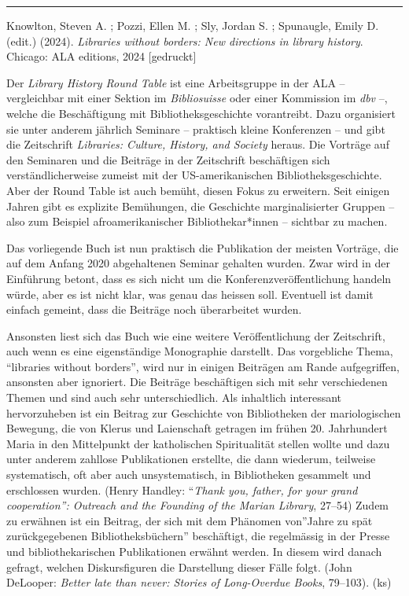 \documentclass[a4paper,
fontsize=11pt,
oneside,
numbers=noperiodatend,
parskip=half-,
bibliography=totoc,
final
]{scrartcl}
\begin{document}
\begin{center}\rule{0.5\linewidth}{0.5pt}\end{center}

Knowlton, Steven A. ; Pozzi, Ellen M. ; Sly, Jordan S. ; Spunaugle,
Emily D. (edit.) (2024). \emph{Libraries without borders: New directions
in library history}. Chicago: ALA editions, 2024 {[}gedruckt{]}

Der \emph{Library History Round Table} ist eine Arbeitsgruppe in der ALA
– vergleichbar mit einer Sektion im \emph{Bibliosuisse} oder einer
Kommission im \emph{dbv} –, welche die Beschäftigung mit
Bibliotheksgeschichte vorantreibt. Dazu organisiert sie unter anderem
jährlich Seminare – praktisch kleine Konferenzen – und gibt die
Zeitschrift \emph{Libraries: Culture, History, and Society} heraus. Die
Vorträge auf den Seminaren und die Beiträge in der Zeitschrift
beschäftigen sich verständlicherweise zumeist mit der US-amerikanischen
Bibliotheksgeschichte. Aber der Round Table ist auch bemüht, diesen
Fokus zu erweitern. Seit einigen Jahren gibt es explizite Bemühungen,
die Geschichte marginalisierter Gruppen – also zum Beispiel
afroamerikanischer Bibliothekar*innen – sichtbar zu machen.

Das vorliegende Buch ist nun praktisch die Publikation der meisten
Vorträge, die auf dem Anfang 2020 abgehaltenen Seminar gehalten wurden.
Zwar wird in der Einführung betont, dass es sich nicht um die
Konferenzveröffentlichung handeln würde, aber es ist nicht klar, was
genau das heissen soll. Eventuell ist damit einfach gemeint, dass die
Beiträge noch überarbeitet wurden.

Ansonsten liest sich das Buch wie eine weitere Veröffentlichung der
Zeitschrift, auch wenn es eine eigenständige Monographie darstellt. Das
vorgebliche Thema, \enquote{libraries without borders}, wird nur in
einigen Beiträgen am Rande aufgegriffen, ansonsten aber ignoriert. Die
Beiträge beschäftigen sich mit sehr verschiedenen Themen und sind auch
sehr unterschiedlich. Als inhaltlich interessant hervorzuheben ist ein
Beitrag zur Geschichte von Bibliotheken der mariologischen Bewegung, die
von Klerus und Laienschaft getragen im frühen 20. Jahrhundert Maria in
den Mittelpunkt der katholischen Spiritualität stellen wollte und dazu
unter anderem zahllose Publikationen erstellte, die dann wiederum,
teilweise systematisch, oft aber auch unsystematisch, in Bibliotheken
gesammelt und erschlossen wurden. (Henry Handley: \enquote{\emph{Thank
you, father, for your grand cooperation'': Outreach and the Founding of
the Marian Library}, 27--54) Zudem zu erwähnen ist ein Beitrag, der sich
mit dem Phänomen von}Jahre zu spät zurückgegebenen Bibliotheksbüchern''
beschäftigt, die regelmässig in der Presse und bibliothekarischen
Publikationen erwähnt werden. In diesem wird danach gefragt, welchen
Diskursfiguren die Darstellung dieser Fälle folgt. (John DeLooper:
\emph{Better late than never: Stories of Long-Overdue Books}, 79--103).
(ks)
\end{document}
